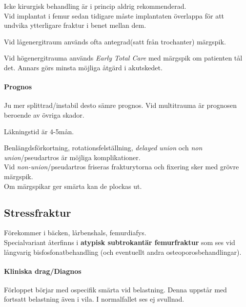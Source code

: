 \documentclass[
  letterpaper,
  DIV=11,
  numbers=noendperiod]{scrreport}
\let\oldparagraph\paragraph
\renewcommand{\paragraph}[1]{\oldparagraph{#1}\mbox{}}
\begin{document}
Icke kirurgisk behandling är i princip aldrig rekommenderad.\\
Vid implantat i femur sedan tidigare måste implantaten överlappa för att
undvika ytterligare fraktur i benet mellan dem.

Vid lågenergitraum används ofta antegrad(satt från trochanter) märgspik.

Vid högenergitrauma används \emph{Early Total Care} med märgspik om
patienten tål det. Annars görs minsta möjliga åtgärd i akutskedet.

\hypertarget{prognos-11}{%
\paragraph{Prognos}\label{prognos-11}}

Ju mer splittrad/instabil desto sämre prognos. Vid multitrauma är
prognosen beroende av övriga skador.

Läkningstid är 4-5mån.

Benlängdsförkortning, rotationsfelställning, \emph{delayed union} och
\emph{non union}/pseudartros är möjliga komplikationer.\\
Vid \emph{non-union}/pseudartros friseras frakturytorna och fixering
sker med grövre märgspik.\\
Om märgspikar ger smärta kan de plockas ut.

\hypertarget{stressfraktur}{%
\subsection{Stressfraktur}\label{stressfraktur}}

Förekommer i bäcken, lårbenshals, femurdiafys.\\
Specialvariant återfinns i \textbf{atypisk subtrokantär femurfraktur}
som ses vid långvarig bisfosfonatbehandling (och eventuellt andra
osteoporosbehandlingar).

\hypertarget{kliniska-dragdiagnos-12}{%
\paragraph{Kliniska drag/Diagnos}\label{kliniska-dragdiagnos-12}}

Förloppet börjar med ospecifik smärta vid belastning. Denna uppstår med
fortsatt belastning även i vila. I normalfallet ses ej svullnad.
\end{document}
